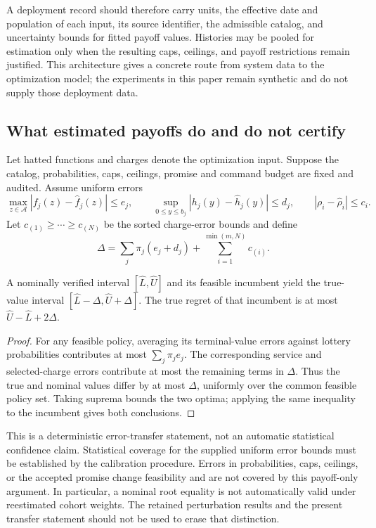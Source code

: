 A deployment record should therefore carry units, the effective date and population of each input, its source identifier, the admissible catalog, and uncertainty bounds for fitted payoff values. Histories may be pooled for estimation only when the resulting caps, ceilings, and payoff restrictions remain justified. This architecture gives a concrete route from system data to the optimization model; the experiments in this paper remain synthetic and do not supply those deployment data.

\subsection{What estimated payoffs do and do not certify}
Let hatted functions and charges denote the optimization input. Suppose the catalog, probabilities, caps, ceilings, promise and command budget are fixed and audited. Assume uniform errors
\[
 \max_{z\in\mathcal A}|f_j(z)-\widehat f_j(z)|\leq e_j,
 \qquad \sup_{0\leq y\leq b_j}|h_j(y)-\widehat h_j(y)|\leq d_j,
 \qquad |\rho_i-\widehat\rho_i|\leq c_i.
\]
Let $c_{(1)}\geq\cdots\geq c_{(N)}$ be the sorted charge-error bounds and define
\[
 \Delta=\sum_j\pi_j(e_j+d_j)+\sum_{i=1}^{\min(m,N)}c_{(i)}.
\]
\begin{proposition}\label{prop:calibration56}
A nominally verified interval $[\widehat L,\widehat U]$ and its feasible incumbent yield the true-value interval
$[\widehat L-\Delta,\widehat U+\Delta]$.
The true regret of that incumbent is at most
$\widehat U-\widehat L+2\Delta$.
\end{proposition}
\begin{proof}
For any feasible policy, averaging its terminal-value errors against lottery probabilities contributes at most $\sum_j\pi_je_j$. The corresponding service and selected-charge errors contribute at most the remaining terms in $\Delta$. Thus the true and nominal values differ by at most $\Delta$, uniformly over the common feasible policy set. Taking suprema bounds the two optima; applying the same inequality to the incumbent gives both conclusions.
\end{proof}
This is a deterministic error-transfer statement, not an automatic statistical confidence claim. Statistical coverage for the supplied uniform error bounds must be established by the calibration procedure. Errors in probabilities, caps, ceilings, or the accepted promise change feasibility and are not covered by this payoff-only argument. In particular, a nominal root equality is not automatically valid under reestimated cohort weights. The retained perturbation results and the present transfer statement should not be used to erase that distinction.
